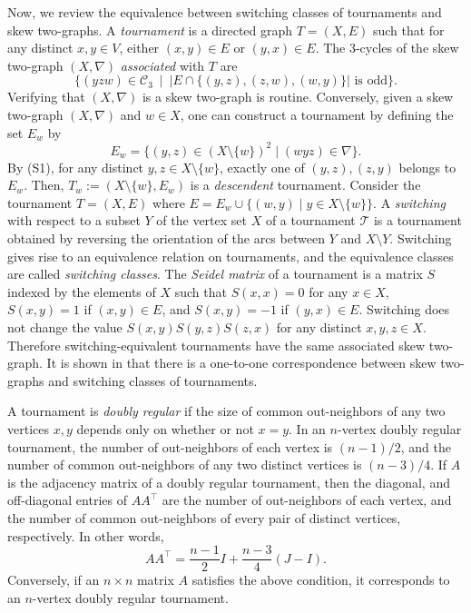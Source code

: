 \documentclass[11pt,oneside]{amsart}
\newcommand{\defn}[1]{\textit{#1}}
\begin{document}
{Now, we review the equivalence between switching classes of tournaments and skew two-graphs. A \defn{tournament} is a directed graph $T=(X,E)$  such that for any distinct  $x,y\in V$, either $(x,y)\in E$ or $(y,x)\in E$. The 3-cycles of the skew two-graph $(X,\nabla)$ {\it associated} with $T$ are 
\[
\big\{(yzw) \in\mathcal C_3 \ \mid\  | E\cap \{(y,z),(z,w),(w,y)\}| \mbox{ is odd}\big\}.
\]
Verifying that $(X,\nabla)$ is a skew two-graph is  routine.  Conversely, given a skew two-graph $(X,\nabla)$ and $w\in X$, one can construct a tournament by defining the set $E_w$ by
\[
E_w=\big\{(y,z)\in (X\setminus\{w\})^2 \mid (wyz)\in \nabla \big\}. 
\]
By (S1), 
for any distinct $y,z\in X\setminus\{w\}$, exactly one of $(y,z),(z,y)$ belongs to $E_w$.  
Then, $T_w:=(X\setminus\{w\},E_w)$ is a \textit{descendent} tournament. 
Consider the tournament $T=(X,E)$ where $E=E_w\cup\{
(w,y) \mid y\in X\setminus\{w\}\}$.   
A \defn{switching} with respect to a subset $Y$ of the vertex set $X$ of a tournament $\mathcal{T}$ is a tournament obtained by reversing the orientation of the arcs between $Y$ and $X\setminus Y$. 
Switching gives rise to an equivalence relation on  tournaments, and the equivalence classes are called \defn{switching classes}.  
The \defn{Seidel matrix} of a tournament is a matrix $S$ indexed by the elements of $X$ such that $S(x,x)=0$ for any $x\in X$, $S(x,y)=1$ if $(x,y)\in E$, and $S(x,y)=-1$ if $(y,x)\in E$. 
Switching does not change the value $S(x,y)S(y,z)S(z,x)$ for any distinct $x,y,z\in X$. 
Therefore switching-equivalent tournaments have the same associated skew two-graph. It is shown in \cite{MR1344584} that there is a one-to-one correspondence between skew two-graphs and switching classes of tournaments.


A tournament is \defn{doubly regular} if the size of common out-neighbors of any two vertices $x,y$ depends only on whether  or not $x=y$. In an $n$-vertex doubly regular tournament, the number of out-neighbors of each vertex is $(n-1)/2$, and the number of common out-neighbors of any two distinct vertices is $(n-3)/4$. If $A$ is the adjacency matrix of a doubly regular tournament, then the diagonal, and off-diagonal entries of  $A A^\top$ are the number of out-neighbors of each vertex, and  the number of common out-neighbors of every pair of distinct vertices, respectively. In other words,
$$
A A^\top= \dfrac{n-1}{2} I + \dfrac{n-3}{4} (J-I).
$$
Conversely, if an $n\times n$ matrix $A$ satisfies the above condition, it corresponds to an $n$-vertex doubly regular tournament. 


}
\end{document}
